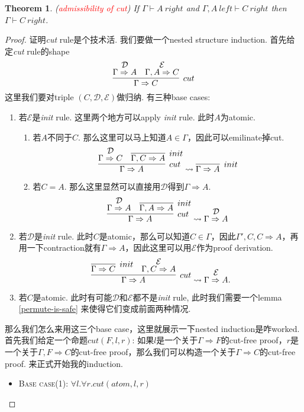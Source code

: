 \documentclass{article}
\theoremstyle{plain}
\newtheorem{theorem}{Theorem}
\newcounter{case}
\theoremstyle{nonumberplain}
\newtheorem{proof}{Proof}
\newcommand{\redt}[1]{\textcolor{red}{#1}}
\begin{document}
\begin{theorem}
\rm (\redt{admissibility of cut}) If $\Gamma \vdash A~right$ and $\Gamma, A~left \vdash C~right$ then $\Gamma \vdash C~right$.
\end{theorem}

\begin{proof}
\rm 证明\emph{cut} rule是个技术活. 我们要做一个nested structure induction. 首先给定\emph{cut} rule的shape
$$
\infer[cut]{\Gamma \Rightarrow C}{\deduce{\Gamma \Rightarrow A}{\mathcal{D}} & \deduce{\Gamma,A \Rightarrow C}{\mathcal{E}}}
$$
这里我们要对triple $(C,\mathcal{D}, \mathcal{E})$做归纳. 有三种base cases:
\begin{enumerate}
	\item 若$\mathcal{E}$是\emph{init} rule. 这里两个地方可以apply \emph{init} rule. 此时$A$为atomic.
	\begin{enumerate}
		\item 若$A$不同于$C$. 那么这里可以马上知道$A \in \Gamma$，因此可以emilinate掉cut. 
		$$
			\infer[cut]{\Gamma \Rightarrow A}{\deduce{\Gamma \Rightarrow C}{\mathcal{D}} & \infer[init]{\Gamma,C \Rightarrow A}{}} \leadsto \infer[init]{\Gamma \Rightarrow A}{}
		$$
		\item 若$C=A$. 那么这里显然可以直接用$\mathcal{D}$得到$\Gamma \Rightarrow A$. 
		$$
			\infer[cut]{\Gamma \Rightarrow A}{\deduce{\Gamma \Rightarrow A}{\mathcal{D}} & \infer[init]{\Gamma,A \Rightarrow A}{}} \leadsto \deduce{\Gamma \Rightarrow A}{\mathcal{D}}
		$$
	\end{enumerate}
	\item 若$\mathcal{D}$是\emph{init} rule. 此时$C$是atomic，那么可以知道$C \in \Gamma$，因此$\Gamma', C ,C \Rightarrow A$，再用一下contraction就有$\Gamma \Rightarrow A$，因此这里可以用$\mathcal{E}$作为proof derivation.
	$$
		\infer[cut]{\Gamma \Rightarrow A}{\infer[init]{\Gamma \Rightarrow C}{} & \deduce{\Gamma, C \Rightarrow A}{\mathcal{E}}} \leadsto \deduce{\Gamma \Rightarrow A}{\mathcal{E}}.
	$$
	\item 若$C$是atomic. 此时有可能$\mathcal{D}$和$\mathcal{E}$都不是\emph{init} rule, 此时我们需要一个lemma \ref{permute-is-safe} 来使得它们变成前面两种情况. 
\end{enumerate}
那么我们怎么来用这三个base case，这里就展示一下nested induction是咋worked. 首先我们给定一个命题$cut(F,l,r)$: 如果$l$是一个关于$\Gamma \Rightarrow F$的cut-free proof，$r$是一个关于$\Gamma, F \Rightarrow C$的cut-free proof，那么我们可以构造一个关于$\Gamma \Rightarrow C$的cut-free proof. 来正式开始我的induction.
\begin{itemize}
	\item \cite{15-317-caie}\textsc{Base case}(1): $\forall l. \forall r.cut(atom,l,r)$
	

\end{itemize}
\end{proof}
\end{document}
